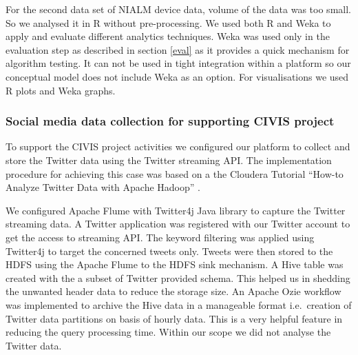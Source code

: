  For the second data set of NIALM device data, volume of the data was too small. So we analysed it in R without pre-processing. We used both R and Weka to apply and evaluate different analytics techniques. Weka was used only in the evaluation step as described in section \ref{eval} as it provides a quick mechanism for algorithm testing. It can not be used in tight integration within a platform so our conceptual model does not include Weka as an option. For visualisations we used R plots and Weka graphs.
 
 \subsubsection{Social media data collection for supporting CIVIS project}
 To support the CIVIS project activities we configured our platform to collect and store the Twitter data using the Twitter streaming API. The implementation procedure for achieving this case was based on a the Cloudera Tutorial ``How-to Analyze Twitter Data with Apache Hadoop'' \cite{clouderatwitter}.
 
 We configured Apache Flume with Twitter4j Java library to  capture the Twitter streaming data. A Twitter application was registered with our Twitter account to get the access to streaming API. The keyword filtering was applied using Twitter4j to target the concerned tweets only. Tweets were then stored to the HDFS using the Apache Flume to the HDFS sink mechanism. A Hive table was created with the a subset of Twitter provided schema. This helped us in shedding the unwanted header data to reduce the storage size. An Apache Ozie workflow was implemented to archive the Hive data in a manageable format i.e.\ creation of Twitter data partitions on basis of hourly data. This is a very helpful feature in reducing the query processing time. Within our scope we did not analyse the Twitter data.    
